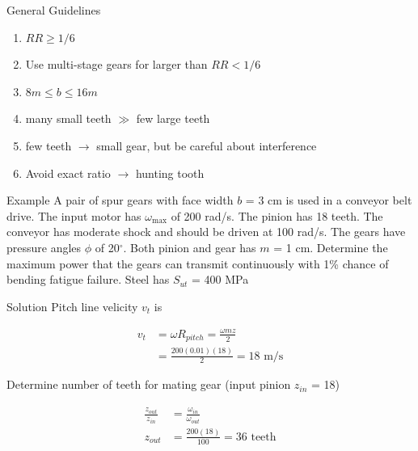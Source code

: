 \documentclass[10pt, svgnames]{beamer}
\begin{document}
\begin{frame}[label={sec:org3ad03a2}]{General Guidelines}
\begin{enumerate}
\item \(RR \geqslant 1/6\)

\item Use multi-stage gears for larger than \(RR < 1/6\)

\item \(8m \leqslant b \leq 16m\)

\item many small teeth \(\gg\) few large teeth

\item few teeth \(\rightarrow\) small gear, but be careful about
interference

\item Avoid exact ratio \(\rightarrow\) hunting tooth
\end{enumerate}
\end{frame}

\begin{frame}[label={sec:orgcf6a984}]{Example}
A pair of spur gears with face width \(b\) = 3 cm is used in a conveyor belt drive. The input motor has \(\omega_{\max}\) of 200 rad/s. The pinion has 18 teeth. The conveyor has moderate shock and should be driven at 100 rad/s. The gears have pressure angles \(\phi\) of 20\(^{\circ}\). Both pinion and gear has \(m\) = 1 cm. Determine the maximum power that the gears can transmit continuously with 1\% chance of bending fatigue failure. Steel has \(S_{ut}\) = 400 MPa
\end{frame}

\begin{frame}[label={sec:org7dc5fab}]{Solution}
Pitch line velicity \(v_{t}\) is

\begin{align*}
   v_{t} &= \omega R_{pitch} = \frac{\omega mz}{2} \\
         &= \frac{200(0.01)(18)}{2} = 18 \text{ m/s}
\end{align*}

Determine number of teeth for mating gear (input pinion \(z_{in}\) = 18)

\begin{align*}
    \frac{z_{out}}{z_{in}} &= \frac{\omega_{in}}{\omega_{out}} \\
    z_{out} &= \frac{200(18)}{100} = 36 \text{ teeth}
\end{align*}
\end{frame}
\end{document}
